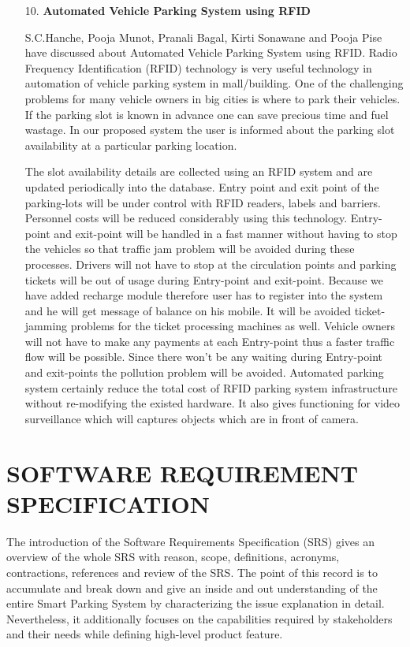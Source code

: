 \documentclass[12pt,a4paper]{report}
\begin{document}
\begin{itemize}
	\item[ 10. ] \textbf{Automated Vehicle Parking System using RFID}
	
	S.C.Hanche, Pooja Munot, Pranali Bagal, Kirti Sonawane and Pooja Pise have discussed about Automated Vehicle Parking System using RFID.
	Radio   Frequency      Identification      (RFID)  
	technology   is   very   useful   technology   in   automation   of 
	vehicle   parking   system   in   mall/building.
	One   of   the 
	challenging problems for many 
	vehicle owners in big cities 
	is where to park their vehicles.
	If the parking slot is known 
	in advance one can save precious time and fuel wastage. In 
	our   proposed   system   the   user   is   informed   about   the 
	parking  slot  availability  at  a  particular  parking  location.\par \hspace{0.5cm}
	The  slot  availability  details  are  collected  using  an  RFID 	system and are updated periodically into the database.
	Entry point and exit point of the parking-lots will be 
	under  control  with  RFID  readers,  labels  and  barriers.   
	Personnel    costs   
	will    be    reduced  considerably  using  this 
	technology. Entry-point and  exit-point will be  handled in 
	a  fast  manner  without  having  to  stop  the  vehicles  so  that 
	traffic  jam    problem    will    be    avoided    during    these 
	processes.  Drivers  will  not  have  to  stop  at  the  circulation 
	points  and  parking  tickets  will  be  out  of  usage  during 
	Entry-point   and   exit-point.   Because   we   have   added 
	recharge  module  therefore  user  has  to  register  into  the 
	system and he will get message of balance on his mobile.
	It will be avoided ticket-jamming problems for  the  ticket  
	processing    machines    as    well.  Vehicle    owners    will    not  
	have  to  make  any payments  at   each Entry-point  thus  a  
	faster traffic flow will be possible. Since there won't be any 
	waiting    during  Entry-point  and exit-points  the  pollution 
	problem   will   be   avoided.   Automated   parking   system 
	certainly  reduce  the  total  cost  of  RFID  parking  system 
	infrastructure without re-modifying the existed hardware.
	It  also  gives  functioning  for  video  surveillance  which  will 
	captures objects which are in front of camera.
\end{itemize}
\newpage
\chapter[SOFTWARE REQ SPECIFICATION]{SOFTWARE REQUIREMENT SPECIFICATION}
\newpage
The introduction of the Software Requirements Specification (SRS) gives an overview of the whole SRS with reason, scope, definitions, acronyms, contractions, references and review of the SRS. The point of this record is to accumulate and break down and give an inside and out understanding of the entire Smart Parking System by characterizing the issue explanation in detail. Nevertheless, it additionally focuses on the capabilities required by stakeholders and their needs while defining high-level product feature.
\end{document}
